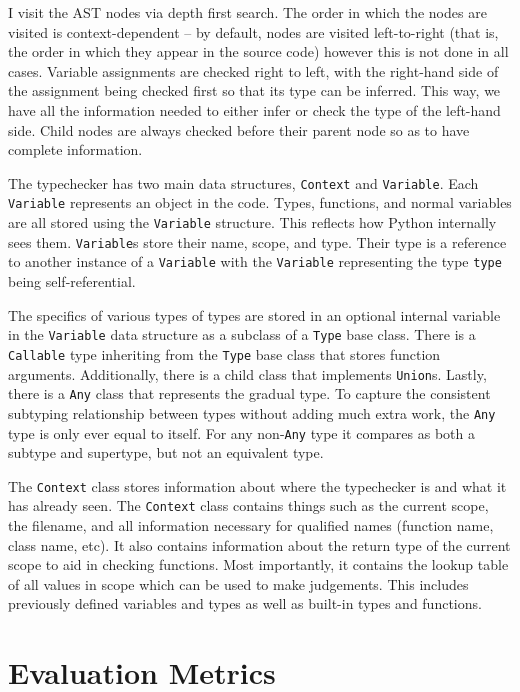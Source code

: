 \documentclass[10pt,twocolumn]{article}
\begin{document}
I visit the AST nodes via depth first search. The order in which the nodes are visited is context-dependent -- by default, nodes are visited left-to-right (that is, the order in which they appear in the source code) however this is not done in all cases. Variable assignments are checked right to left, with the right-hand side of the assignment being checked first so that its type can be inferred. This way, we have all the information needed to either infer or check the type of the left-hand side. Child nodes are always checked before their parent node so as to have complete information. 

The typechecker has two main data structures, \verb|Context| and \verb|Variable|. Each \verb|Variable| represents an object in the code. Types, functions, and normal variables are all stored using the \verb|Variable| structure. This reflects how Python internally sees them. \verb|Variable|s store their name, scope, and type. Their type is a reference to another instance of a \verb|Variable| with the \verb|Variable| representing the type \verb|type| being self-referential. 

The specifics of various types of types are stored in an optional internal variable in the \verb|Variable| data structure as a subclass of a \verb|Type| base class. There is a \verb|Callable| type inheriting from the \verb|Type| base class that stores function arguments. Additionally, there is a child class that implements \verb|Union|s. Lastly, there is a \verb|Any| class that represents the gradual type. To capture the consistent subtyping relationship between types without adding much extra work, the \verb|Any| type is only ever equal to itself. For any non-\verb|Any| type it compares as both a subtype and supertype, but not an equivalent type.

The \verb|Context| class stores information about where the typechecker is and what it has already seen. The \verb|Context| class contains things such as the current scope, the filename, and all information necessary for qualified names (function name, class name, etc). It also contains information about the return type of the current scope to aid in checking functions. Most importantly, it contains the lookup table of all values in scope which can be used to make judgements. This includes previously defined variables and types as well as built-in types and functions.


\section{Evaluation Metrics}

\end{document}
